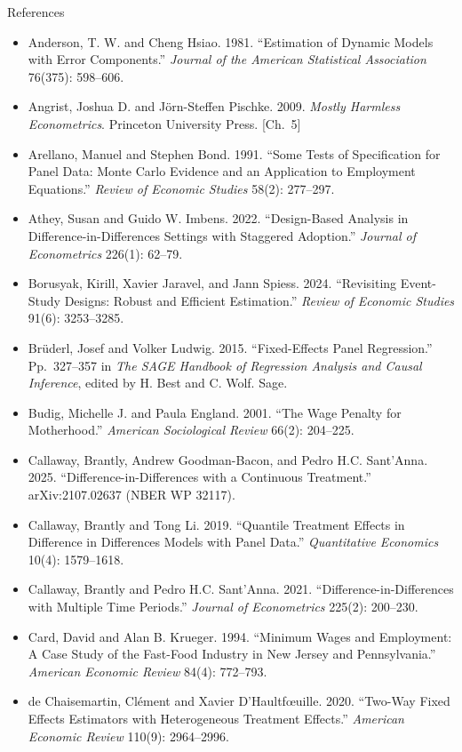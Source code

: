 \documentclass[aspectratio=169,11pt,xcolor=dvipsnames]{beamer}
\begin{document}
\begin{frame}[allowframebreaks,t]{References}
\footnotesize
\begin{itemize}\itemsep2pt
\item Anderson, T. W. and Cheng Hsiao. 1981. ``Estimation of Dynamic Models with Error Components.'' \textit{Journal of the American Statistical Association} 76(375): 598--606.
\item Angrist, Joshua D. and J\"orn-Steffen Pischke. 2009. \textit{Mostly Harmless Econometrics}. Princeton University Press. [Ch.\ 5]
\item Arellano, Manuel and Stephen Bond. 1991. ``Some Tests of Specification for Panel Data: Monte Carlo Evidence and an Application to Employment Equations.'' \textit{Review of Economic Studies} 58(2): 277--297.
\item Athey, Susan and Guido W. Imbens. 2022. ``Design-Based Analysis in Difference-in-Differences Settings with Staggered Adoption.'' \textit{Journal of Econometrics} 226(1): 62--79.
\item Borusyak, Kirill, Xavier Jaravel, and Jann Spiess. 2024. ``Revisiting Event-Study Designs: Robust and Efficient Estimation.'' \textit{Review of Economic Studies} 91(6): 3253--3285.
\item Brüderl, Josef and Volker Ludwig. 2015. ``Fixed-Effects Panel Regression.'' Pp.\ 327--357 in \textit{The SAGE Handbook of Regression Analysis and Causal Inference}, edited by H. Best and C. Wolf. Sage.
\item Budig, Michelle J. and Paula England. 2001. ``The Wage Penalty for Motherhood.'' \textit{American Sociological Review} 66(2): 204--225.
\item Callaway, Brantly, Andrew Goodman-Bacon, and Pedro H.C. Sant'Anna. 2025. ``Difference-in-Differences with a Continuous Treatment.'' arXiv:2107.02637 (NBER WP 32117).
\item Callaway, Brantly and Tong Li. 2019. ``Quantile Treatment Effects in Difference in Differences Models with Panel Data.'' \textit{Quantitative Economics} 10(4): 1579--1618.
\item Callaway, Brantly and Pedro H.C. Sant'Anna. 2021. ``Difference-in-Differences with Multiple Time Periods.'' \textit{Journal of Econometrics} 225(2): 200--230.
\item Card, David and Alan B. Krueger. 1994. ``Minimum Wages and Employment: A Case Study of the Fast-Food Industry in New Jersey and Pennsylvania.'' \textit{American Economic Review} 84(4): 772--793.
\item de Chaisemartin, Cl\'ement and Xavier D'Haultf\oe uille. 2020. ``Two-Way Fixed Effects Estimators with Heterogeneous Treatment Effects.'' \textit{American Economic Review} 110(9): 2964--2996.

\end{itemize}
\end{frame}
\end{document}
